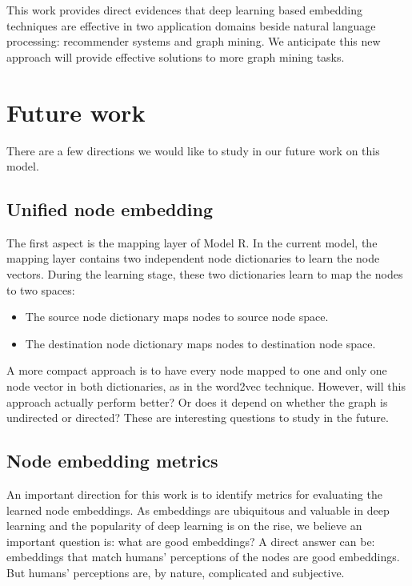 \documentclass[12pt]{WSUThesis}
\theoremstyle{definition}
\begin{document}
This work provides direct evidences that deep learning based embedding techniques are effective in two application domains beside natural language processing: recommender systems and graph mining.
We anticipate this new approach will provide effective solutions to more
graph mining tasks.

\section{Future work}
There are a few directions we would like to study in our future work on this model.

\subsection{Unified node embedding}

The first aspect is the mapping layer of Model R.
In the current model, the mapping layer contains two independent node dictionaries
to learn the node vectors.
During the learning stage, these two dictionaries learn to map the nodes to two spaces:
\begin{itemize}
	\item The source node dictionary maps nodes to source node space.
	\item The destination node dictionary maps nodes to destination node space.
\end{itemize}
A more compact approach is to have every node mapped to
one and only one node vector in both dictionaries,
as in the word2vec technique.
However, will this approach actually perform better?
Or does it depend on whether the graph is undirected or directed?
These are interesting questions to study in the future.

\subsection{Node embedding metrics}
An important direction for this work is to identify metrics for evaluating the learned node embeddings.
As embeddings are ubiquitous and valuable in deep learning and the popularity of deep learning is on the rise, we believe an important question is: what are good embeddings?
A direct answer can be: embeddings that match humans' perceptions of the nodes are good embeddings.
But humans' perceptions are, by nature, complicated and subjective.
\end{document}
